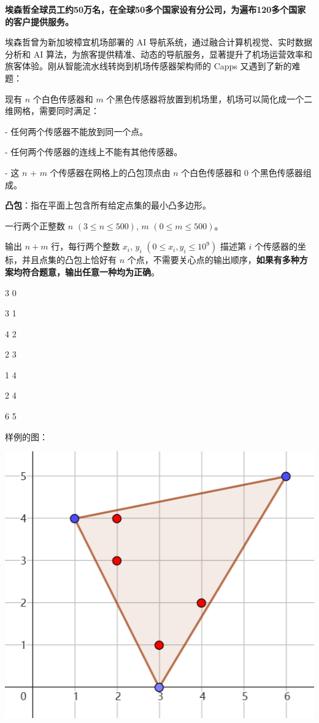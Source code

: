 
\textbf{埃森哲全球员工约50万名，在全球50多个国家设有分公司，为遍布120多个国家的客户提供服务。}

埃森哲曾为新加坡樟宜机场部署的 AI 导航系统，通过融合计算机视觉、实时数据分析和 AI 算法，为旅客提供精准、动态的导航服务，显著提升了机场运营效率和旅客体验。刚从智能流水线转岗到机场传感器架构师的 Capps 又遇到了新的难题：

现有 $n$ 个白色传感器和 $m$ 个黑色传感器将放置到机场里，机场可以简化成一个二维网格，需要同时满足：

- 任何两个传感器不能放到同一个点。

- 任何两个传感器的连线上不能有其他传感器。

- 这 $n$ + $m$ 个传感器在网格上的凸包顶点由 $n$ 个白色传感器和 $0$ 个黑色传感器组成。

\textbf{凸包}：指在平面上包含所有给定点集的最小凸多边形。


一行两个正整数 $n$ $(3\leqslant n \leqslant 500)$, $m$ $(0 \leqslant m \leqslant 500)$。


输出 $n+m$ 行，每行两个整数 $x_i$, $y_i$ $(0 \leqslant x_i, y_i \leqslant 10^9)$ 描述第 $i$ 个传感器的坐标，并且点集的凸包上恰好有 $n$ 个点，不需要关心点的输出顺序，\textbf{如果有多种方案均符合题意，输出任意一种均为正确}。

{%
3 0

3 1

4 2

2 3

1 4

2 4

6 5
}


样例的图：

\includegraphics[width=.5\linewidth]{jpg.png}